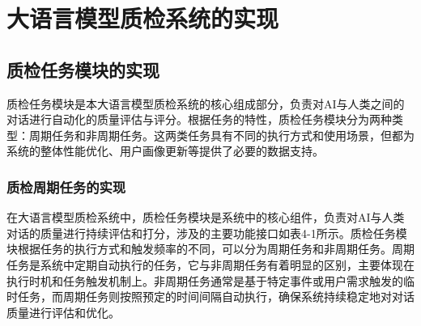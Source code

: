 \chapter{大语言模型质检系统的实现}
\section{质检任务模块的实现}
质检任务模块是本大语言模型质检系统的核心组成部分，负责对AI与人类之间的对话进行自动化的质量评估与评分。根据任务的特性，质检任务模块分为两种类型：周期任务和非周期任务。这两类任务具有不同的执行方式和使用场景，但都为系统的整体性能优化、用户画像更新等提供了必要的数据支持。
\subsection{质检周期任务的实现}

在大语言模型质检系统中，质检任务模块是系统中的核心组件，负责对AI与人类对话的质量进行持续评估和打分，涉及的主要功能接口如表4-1所示。质检任务模块根据任务的执行方式和触发频率的不同，可以分为周期任务和非周期任务。周期任务是系统中定期自动执行的任务，它与非周期任务有着明显的区别，主要体现在执行时机和任务触发机制上。非周期任务通常是基于特定事件或用户需求触发的临时任务，而周期任务则按照预定的时间间隔自动执行，确保系统持续稳定地对对话质量进行评估和优化。

